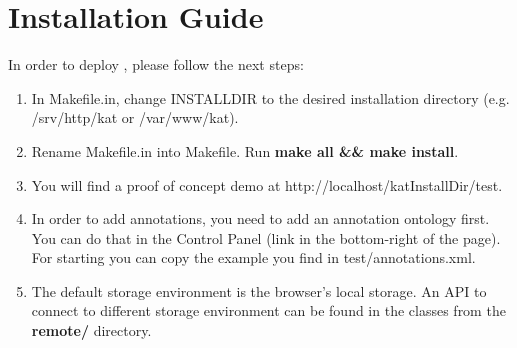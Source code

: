 \section{Installation Guide}

In order to deploy \KAT, please follow the next steps:

\begin{enumerate}
\item In Makefile.in, change INSTALLDIR to the desired installation directory
  (e.g. /srv/http/kat or /var/www/kat).
\item Rename Makefile.in into Makefile. Run \textbf{make all \&\& make install}.
\item You will find a proof of concept demo at http://localhost/katInstallDir/test.
\item In order to add annotations, you need to add an annotation ontology first. You can
  do that in the \KAT Control Panel (link in the bottom-right of the page). For starting
  you can copy the example you find in test/annotations.xml.
\item The default storage environment is the browser's local storage. An API to connect to
  different storage environment can be found in the classes from the \textbf{remote/}
  directory.
\end{enumerate}

